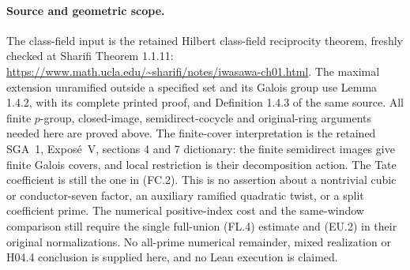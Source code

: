 \paragraph{Source and geometric scope.}
The class-field input is the retained Hilbert class-field reciprocity
theorem, freshly checked at Sharifi Theorem 1.1.11:
\url{https://www.math.ucla.edu/~sharifi/notes/iwasawa-ch01.html}.
The maximal extension unramified outside a specified set and its
Galois group use Lemma 1.4.2, with its complete printed proof, and
Definition 1.4.3 of the same source.
All finite $p$-group, closed-image, semidirect-cocycle and original-ring
arguments needed here are proved above.
The finite-cover interpretation is the retained SGA~1, Expos\'e~V,
sections 4 and 7 dictionary: the finite semidirect images give finite
Galois covers, and local restriction is their decomposition action.
The Tate coefficient is still the one in (FC.2).
This is no assertion about a nontrivial cubic or conductor-seven
factor, an auxiliary ramified quadratic twist, or a split coefficient
prime.  The numerical positive-index cost and the same-window
comparison still require the single full-union (FL.4) estimate and
(EU.2) in their original normalizations.
No all-prime numerical remainder, mixed realization or H04.4
conclusion is supplied here, and no Lean execution is claimed.
